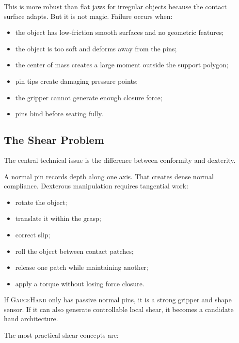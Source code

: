 \documentclass[11pt]{article}
\newcommand{\GaugeHand}{\textsc{GaugeHand}}
\begin{document}
This is more robust than flat jaws for irregular objects because the contact surface adapts. But it is not magic. Failure occurs when:

\begin{itemize}[leftmargin=*]
  \item the object has low-friction smooth surfaces and no geometric features;
  \item the object is too soft and deforms away from the pins;
  \item the center of mass creates a large moment outside the support polygon;
  \item pin tips create damaging pressure points;
  \item the gripper cannot generate enough closure force;
  \item pins bind before seating fully.
\end{itemize}

\subsection{The Shear Problem}

The central technical issue is the difference between conformity and dexterity.

A normal pin records depth along one axis. That creates dense normal compliance. Dexterous manipulation requires tangential work:

\begin{itemize}[leftmargin=*]
  \item rotate the object;
  \item translate it within the grasp;
  \item correct slip;
  \item roll the object between contact patches;
  \item release one patch while maintaining another;
  \item apply a torque without losing force closure.
\end{itemize}

If \GaugeHand{} only has passive normal pins, it is a strong gripper and shape sensor. If it can also generate controllable local shear, it becomes a candidate hand architecture.

The most practical shear concepts are:
\end{document}
